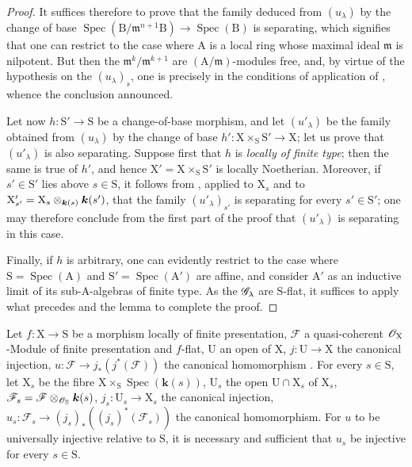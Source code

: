 \begin{proof}
It suffices therefore to prove that the family deduced from $(u_\lambda)$ by the change of base $\operatorname{Spec}(\mathrm{B}/\mathfrak{m}^{n+1}\mathrm{B})\to\operatorname{Spec}(\mathrm{B})$ is separating, which signifies that one can restrict to the case where $\mathrm{A}$ is a local ring whose maximal ideal $\mathfrak{m}$ is nilpotent.
But then the $\mathfrak{m}^k/\mathfrak{m}^{k+1}$ are $(\mathrm{A}/\mathfrak{m})$-modules free, and, by virtue of the hypothesis on the $(u_\lambda)_s$, one is precisely in the conditions of application of , whence the conclusion announced.

Let now $h:\mathrm{S}'\to\mathrm{S}$ be a change-of-base morphism, and let $(u'_\lambda)$ be the family obtained from $(u_\lambda)$ by the change of base $h':\mathrm{X}\times_\mathrm{S}\mathrm{S}'\to\mathrm{X}$; let us prove that $(u'_\lambda)$ is also separating.
Suppose first that $h$ is \emph{locally of finite type}; then the same is true of $h'$, and hence $\mathrm{X}'=\mathrm{X}\times_\mathrm{S}\mathrm{S}'$ is locally Noetherian. Moreover, if $s'\in\mathrm{S}'$ lies above $s\in\mathrm{S}$, it follows from , applied to $\mathrm{X}_s$ and to $\mathrm{X}'_{s'}=\mathrm{X}_s\otimes_{\boldsymbol{k}(s)}\boldsymbol{k}(s')$, that the family $(u'_\lambda)_{s'}$ is separating for every $s'\in\mathrm{S}'$; one may therefore conclude from the first part of the proof that $(u'_\lambda)$ is separating in this case.

Finally, if $h$ is arbitrary, one can evidently restrict to the case where $\mathrm{S}=\operatorname{Spec}(\mathrm{A})$ and $\mathrm{S}'=\operatorname{Spec}(\mathrm{A}')$ are affine, and consider $\mathrm{A}'$ as an inductive limit of its sub-$\mathrm{A}$-algebras of finite type.
As the $\mathscr{G}_\lambda$ are $\mathrm{S}$-flat, it suffices to apply what precedes and the lemma  to complete the proof.
\end{proof}

\begin{proposition}[11.9.17]
\label{IV.11.9.17}
Let $f:\mathrm{X}\to\mathrm{S}$ be a morphism locally of finite presentation, $\mathscr{F}$ a quasi-coherent $\mathscr{O}_\mathrm{X}$-Module of finite presentation and $f$-flat, $\mathrm{U}$ an open of $\mathrm{X}$, $j:\mathrm{U}\to\mathrm{X}$ the canonical injection, $u:\mathscr{F}\to j_*(j^*(\mathscr{F}))$ the canonical homomorphism .
For every $s\in\mathrm{S}$, let $\mathrm{X}_s$ be the fibre $\mathrm{X}\times_\mathrm{S}\operatorname{Spec}(\boldsymbol{k}(s))$, $\mathrm{U}_s$ the open $\mathrm{U}\cap\mathrm{X}_s$ of $\mathrm{X}_s$, $\mathscr{F}_s=\mathscr{F}\otimes_{\mathscr{O}_\mathrm{S}}\boldsymbol{k}(s)$, $j_s:\mathrm{U}_s\to\mathrm{X}_s$ the canonical injection, $u_s:\mathscr{F}_s\to(j_s)_*((j_s)^*(\mathscr{F}_s))$ the canonical homomorphism.
For $u$ to be universally injective relative to $\mathrm{S}$, it is necessary and sufficient that $u_s$ be injective for every $s\in\mathrm{S}$.
\end{proposition}

